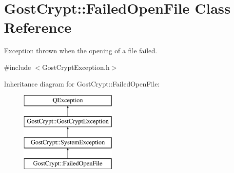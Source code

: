 \hypertarget{class_gost_crypt_1_1_failed_open_file}{}\section{Gost\+Crypt\+:\+:Failed\+Open\+File Class Reference}
\label{class_gost_crypt_1_1_failed_open_file}


Exception thrown when the opening of a file failed.  




{\ttfamily \#include $<$Gost\+Crypt\+Exception.\+h$>$}

Inheritance diagram for Gost\+Crypt\+:\+:Failed\+Open\+File\+:\begin{figure}[H]
\begin{center}
\leavevmode
\includegraphics[height=4.000000cm]{class_gost_crypt_1_1_failed_open_file}
\end{center}
\end{figure}
